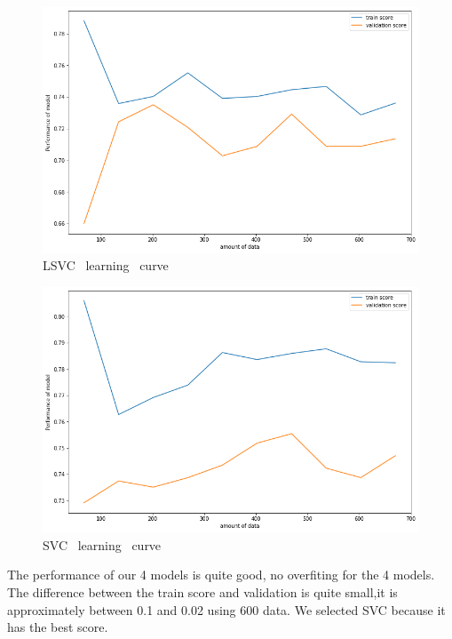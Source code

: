 \documentclass[12pt]{article}
\begin{document}
\begin{figure}[H]
\begin{center}
\includegraphics[scale=0.5]{learning_curve_3.png} 
\caption[]{ LSVC \ learning \ curve }
\end{center}
\end{figure}

\begin{figure}[H]
\begin{center}
\includegraphics[scale=0.5]{learning_curve_4.png} 
\caption[]{ SVC \ learning \ curve }
\end{center}
\end{figure}


The performance of our 4 models is quite good, no overfiting for the 4 models. The difference between the train score and validation is quite small,it is approximately between 0.1 and 0.02 using 600 data. We selected SVC because it has the best score.
\end{document}
